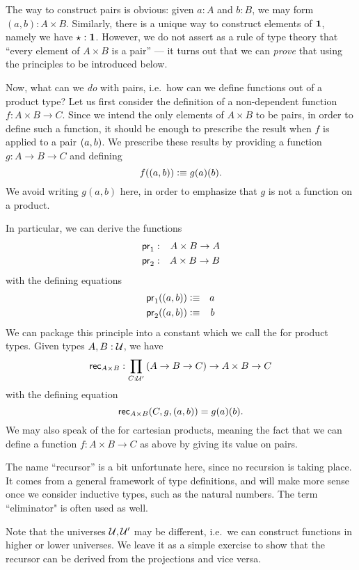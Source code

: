 The way to construct pairs is obvious: given $a:A$ and $b:B$, we may form $(a,b):A\times B$.
Similarly, there is a unique way to construct elements of $\mathbf{1}$, namely we have $\star:\mathbf{1}$.
However, we do not assert as a rule of type theory that ``every element of $A\times B$ is a pair'' --- it turns out that we can \emph{prove} that using the principles to be introduced below.

Now, what can we \emph{do} with pairs, i.e.\ how can we define functions out of a product type?
Let us first consider the definition of a non-dependent function $f : A\times B \to C$.
Since we intend the only elements of $A\times B$ to be pairs, in order to define such a function, it should be enough to prescribe the result
when $f$ is applied to a pair $(a,b)$.  We prescribe these results by
providing a function $g : A \to B \to C$ and defining
\[ f((a,b)) \vcentcolon\equiv g(a)(b). \]
We avoid writing $g(a,b)$ here, in order to emphasize that $g$ is not a
function on a product. 

In particular, we can derive the  functions
\begin{eqnarray*}
  \mathsf{pr}_{1} & : & A \times B \to A \\
  \mathsf{pr}_{2} & : & A \times B \to B
\end{eqnarray*}
with the defining equations 
\begin{eqnarray*}
  \mathsf{pr}_{1}((a,b)) & \vcentcolon\equiv & a \\
  \mathsf{pr}_{2}((a,b)) & \vcentcolon\equiv & b
\end{eqnarray*}
%
%
We can package this principle into a constant which we call the
 for product
types.  Given types $A,B : \mathcal{U}$, we have
%
\begin{equation}
  \rec{A\times B} : \prd{C:\UU'}(A \to B \to C) \to A \times B \to C
\end{equation}
with the defining equation
\[\mathsf{rec}_{A\times B}(C,g,(a,b)) = g(a)(b). \]
We may also speak of the  for cartesian products, meaning the fact that we can define a function $f:A\times B\to C$ as above by giving its value on pairs.

The name ``recursor'' is a bit unfortunate here, since no recursion is taking place.
It comes from a general framework of type definitions, and will make more sense once we consider inductive types, such as
the natural numbers.  The term ``eliminator" is often used as well.

Note that the universes $\mathcal{U},\mathcal{U}'$ may be different, i.e.\ we can
construct functions in higher or lower universes. 
We leave it as a simple exercise to show that the recursor can be
derived from the projections and vice versa.


